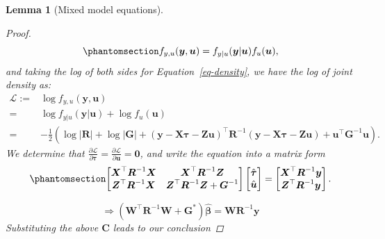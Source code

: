 \documentclass[
  a4paper,
  oneside,
  openany,
  12pt,
  onecolumn]{book}
\theoremstyle{definition}
\theoremstyle{definition}
\theoremstyle{plain}
\newtheorem{lemma}{Lemma}[chapter]
\theoremstyle{remark}
\begin{document}
\begin{lemma}[Mixed model
equations]
\begin{proof}
\begin{equation}\phantomsection\label{eq-density}{f_{y,u}(\boldsymbol{y}, \boldsymbol{u}) = f_{y|u}(\boldsymbol{y}|\boldsymbol{u})f_u(\boldsymbol{u}),}\end{equation}
and taking the log of both sides for Equation~\ref{eq-density}, we have
the log of joint density as: \[\begin{aligned}
\mathcal{L} :=& \log f_{y,u}(\boldsymbol{y}, \boldsymbol{u}) \\
=& \log f_{y|u}(\boldsymbol{y}|\boldsymbol{u})+\log f_u(\boldsymbol{u})\\
=& -\frac{1}{2}\left(\log|\boldsymbol{R}|+\log|\boldsymbol{G}|+(\boldsymbol{y}-\boldsymbol{X}\boldsymbol{\tau}-\boldsymbol{Z}\boldsymbol{u})^\top \mathbf{R}^{-1}(\boldsymbol{y}-\boldsymbol{X}\boldsymbol{\tau}-\boldsymbol{Z}\boldsymbol{u})+\boldsymbol{u}^\top\boldsymbol{G}^{-1}\boldsymbol{u}\right).
\end{aligned}\] We determine that
\(\frac{\partial\mathcal{L}}{\partial\boldsymbol{\tau}}=\frac{\partial\mathcal{L}}{\partial\boldsymbol{u}}=\boldsymbol{0}\),
and write the equation into a matrix form
\begin{equation}\phantomsection\label{eq-ll}{
\begin{bmatrix}
\boldsymbol{X}^\top\boldsymbol{R}^{-1}\boldsymbol{X} & \boldsymbol{X}^\top\boldsymbol{R}^{-1}\boldsymbol{Z}\\
\boldsymbol{Z}^\top\boldsymbol{R}^{-1}\boldsymbol{X} & \boldsymbol{Z}^\top\boldsymbol{R}^{-1}\boldsymbol{Z}+ \boldsymbol{G}^{-1}
\end{bmatrix}
\begin{bmatrix}
\hat{\boldsymbol{\tau}}\\
\hat{\boldsymbol{u}}
\end{bmatrix}=
\begin{bmatrix}
\boldsymbol{X}^\top\boldsymbol{R}^{-1}\boldsymbol{y}\\
\boldsymbol{Z}^\top\boldsymbol{R}^{-1}\boldsymbol{y}
\end{bmatrix}.
}\end{equation}

\[
\Rightarrow (\boldsymbol{W}^\top\boldsymbol{R}^{-1}\boldsymbol{W} + \boldsymbol{G}^*)\hat{\boldsymbol{\beta}}
=\boldsymbol{W}\boldsymbol{R}^{-1}\boldsymbol{y}
\] Substituting the above \(\boldsymbol{C}\) leads to our conclusion
\end{proof}

\end{lemma}
\end{document}
